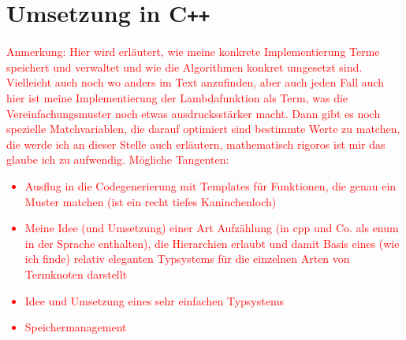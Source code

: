 \documentclass{scrartcl}
\begin{document}
\section{Umsetzung in C\texttt{++}}
\textcolor{red}{
\begin{itshape}
Anmerkung: Hier wird erläutert, wie meine konkrete Implementierung Terme speichert und verwaltet und wie die Algorithmen konkret umgesetzt sind. Vielleicht auch noch wo anders im Text anzufinden, aber auch jeden Fall auch hier ist meine Implementierung der Lambdafunktion als Term, was die Vereinfachungsmuster noch etwas ausdrucksstärker macht. Dann gibt es noch spezielle Matchvariablen, die darauf optimiert sind bestimmte Werte zu matchen, die werde ich an dieser Stelle auch erläutern, mathematisch rigoros ist mir das glaube ich zu aufwendig.
Mögliche Tangenten:
\begin{itemize}
\item {Ausflug in die Codegenerierung mit Templates für Funktionen, die genau ein Muster matchen (ist ein recht tiefes Kaninchenloch)}
\item {Meine Idee (und Umsetzung) einer Art Aufzählung (in cpp und Co. als enum in der Sprache enthalten), die Hierarchien erlaubt und damit Basis eines (wie ich finde) relativ eleganten Typsystems für die einzelnen Arten von Termknoten darstellt}
\item {Idee und Umsetzung eines sehr einfachen Typsystems}
\item {Speichermanagement}
\end{itemize}
\end{itshape}
}
\end{document}

